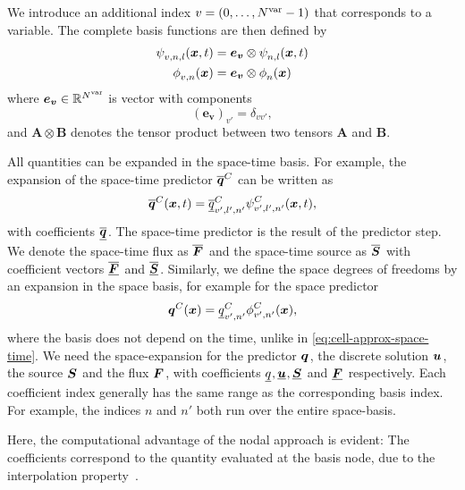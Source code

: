 We introduce an additional index $v = (0, \ldots, N^{\text{var}} - 1)$ that corresponds to a variable.
The complete basis functions are then defined by
\begin{align}
  \begin{split}
    \stbasis[][v,n,l] (\bm{x},t) &= \bm{e_v} \otimes \stbasis[][n,l] (\bm{x}, t) \\
    \sbasis[][v,n] (\bm{x}) &= \bm{e_v} \otimes \sbasis[][n] (\bm{x})
  \end{split}
\end{align}
where $\bm{e_v} \in \mathbb{R}^{N^{\text{var}}}$ is vector with components
\begin{equation}
  \left( \bm{e_v} \right)_{v'} = \delta_{v v'},
\end{equation}
and $\bm{A} \otimes \bm{B}$ denotes the tensor product between two tensors $\bm{A}$ and $\bm{B}$.

All quantities can be expanded in the space-time basis.
For example, the expansion of the space-time predictor $\stpredictor[\cell]$ can be written as
\begin{equation}
  \label{eq:cell-approx-space-time}
  \stpredictor[\cell] (\bm{x}, t) = \stpredictorCoeff[\cell][v',l',n'] \stbasis[\cell][v',l',n'](\bm{x}, t),
\end{equation}
with coefficients $\stpredictorCoeff$.
The space-time predictor is the result of the predictor step.
We denote the space-time flux as $\stflux$ and the space-time source as $\stsource$ with coefficient vectors $\stfluxCoeff$ and $\stsourceCoeff$.
Similarly, we define the space degrees of freedoms by an expansion in the space basis, for example for the space predictor
\begin{equation}
  \label{eq:cell-approx-space}
  \spredictor[\cell] (\bm{x}) = \spredictorCoeff[\cell][v',n'] \sbasis[\cell][v',n'] (\bm{x}),
\end{equation}
where the basis does not depend on the time, unlike in \cref{eq:cell-approx-space-time}.
We need the space-expansion for the predictor $\spredictor$, the discrete solution $\ssol$, the source $\ssource$ and the flux $\sflux$,
with coefficients $\spredictorCoeff, \ssolCoeff, \ssourceCoeff$ and $\sfluxCoeff$ respectively.
Each coefficient index generally has the same range as the corresponding basis index.
For example, the indices $n$ and $n'$ both run over the entire space-basis.

Here, the computational advantage of the nodal approach is evident:
The coefficients correspond to the quantity evaluated at the basis node, due to the interpolation property~.

